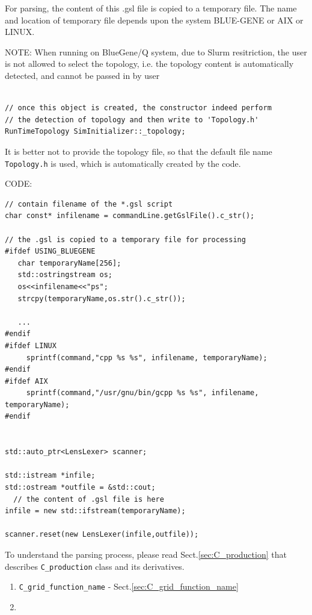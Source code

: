 \begin{mdframed}

For parsing, the content of this .gsl file is copied to a temporary file.
The name and location of temporary file depends upon the system BLUE-GENE or AIX
or LINUX. 

NOTE: When running on BlueGene/Q system, due to Slurm resitriction, the user is
not allowed to select the topology, i.e. the topology content is
automatically detected, and cannot be passed in by user
\begin{lstlisting}

// once this object is created, the constructor indeed perform 
// the detection of topology and then write to 'Topology.h'
RunTimeTopology SimInitializer::_topology;
\end{lstlisting}

It is better not to provide the topology file, so that the default
file name \verb!Topology.h! is used, which is automatically created by the
code.

CODE:
{\small 
\begin{verbatim}
// contain filename of the *.gsl script
char const* infilename = commandLine.getGslFile().c_str();  

// the .gsl is copied to a temporary file for processing
#ifdef USING_BLUEGENE
   char temporaryName[256];
   std::ostringstream os;
   os<<infilename<<"ps";
   strcpy(temporaryName,os.str().c_str());
   
   ...
#endif
#ifdef LINUX
     sprintf(command,"cpp %s %s", infilename, temporaryName);                                                                                                                                          
#endif
#ifdef AIX
     sprintf(command,"/usr/gnu/bin/gcpp %s %s", infilename, temporaryName);
#endif


std::auto_ptr<LensLexer> scanner;

std::istream *infile;
std::ostream *outfile = &std::cout;  
  // the content of .gsl file is here
infile = new std::ifstream(temporaryName);
   
scanner.reset(new LensLexer(infile,outfile)); 
\end{verbatim}
}
\end{mdframed}

To understand the parsing process, please read Sect.\ref{sec:C_production} that
describes \verb!C_production! class and its derivatives.
\begin{enumerate}
  \item \verb!C_grid_function_name! - Sect.\ref{sec:C_grid_function_name}
  \item 
\end{enumerate}

